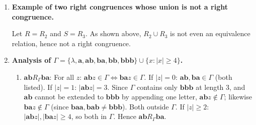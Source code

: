 \begin{enumerate}[{2.}1.]
\begin{enumerate}
\item In general: since both $R$ and $S$ are equivalence relations, $R\cap S$ is also an equivalence relation. And if $x R\cap S y$, then $x R y$ and $x S y$. For any $z$, right congruence of $R$ and $S$ gives $xz R yz$ and $xz S yz$, hence $xz (R\cap S) yz$. So $R\cap S$ is a right congruence. Also $R\cap S\subseteq R$ and $R\cap S\subseteq S$, so its classes refine the classes of both $R$ and $S$.

\item $R_2\cup R_3$: $\lambda R_2 \mathbf{aa}$ and $\mathbf{a} R_3 \mathbf{aaaa}$. But is $\lambda R_2\cup R_3 \mathbf{a}$? $|\lambda|-|\mathbf{a}|=-1$, not divisible by 2 or 3. No. Is $\lambda R_2\cup R_3 \mathbf{aaa}$? $0-3=-3$, divisible by 3. Yes. Now $\lambda R_2\cup R_3 \mathbf{aaa}$ and $\mathbf{aaa} R_2\cup R_3 \mathbf{aaaaa}$ (length diff=2). But is $\lambda R_2\cup R_3 \mathbf{aaaaa}$? Length diff=5, not divisible by 2 or 3. No. So transitivity fails: not an equivalence relation.

\item If $R\cup S$ is an equivalence relation: for any $x,y$ with $x R\cup S y$, we have $x R y$ or $x S y$. Either way, for any $z$: $xz R yz$ or $xz S yz$ (by right congruence of $R$ or $S$), hence $xz R\cup S yz$.
\end{enumerate}

\item \textbf{Example of two right congruences whose union is not a right congruence.}

Let $R=R_2$ and $S=R_3$. As shown above, $R_2\cup R_3$ is not even an equivalence relation, hence not a right congruence.

\item \textbf{Analysis of $\Gamma=\{\lambda,\mathbf{a},\mathbf{ab},\mathbf{ba},\mathbf{bb},\mathbf{bbb}\}\cup\{x:|x|\geq 4\}$.}

\begin{enumerate}
\item $\mathbf{ab} R_\Gamma \mathbf{ba}$: For all $z$: $\mathbf{ab}z\in\Gamma\Leftrightarrow\mathbf{ba}z\in\Gamma$. If $|z|=0$: $\mathbf{ab},\mathbf{ba}\in\Gamma$ (both listed). \checkmark If $|z|=1$: $|\mathbf{ab}z|=3$. Since $\Gamma$ contains only $\mathbf{bbb}$ at length 3, and $\mathbf{ab}$ cannot be extended to $\mathbf{bbb}$ by appending one letter, $\mathbf{ab}z\notin\Gamma$; likewise $\mathbf{ba}z\notin\Gamma$ (since $\mathbf{baa},\mathbf{bab}\neq\mathbf{bbb}$). Both outside $\Gamma$. \checkmark If $|z|\geq 2$: $|\mathbf{ab}z|,|\mathbf{ba}z|\geq 4$, so both in $\Gamma$. \checkmark Hence $\mathbf{ab} R_\Gamma \mathbf{ba}$.


\end{enumerate}
\end{enumerate}
